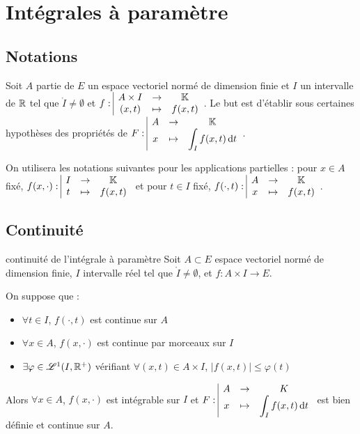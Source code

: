 \section{Intégrales à paramètre}
\subsection{Notations }

Soit $A$ partie de $E$ un espace vectoriel normé de dimension finie et $I$ un 
intervalle de $\mathbb{R}$ tel que $\mathring I \neq \emptyset$ et 
$f: \space \begin{array}{|ccc} \displaystyle A \times I & \to & \displaystyle \mathbb{K} \\ \displaystyle (x, t) & \mapsto & \displaystyle f(x, t) \end{array}$. Le but est d'établir sous 
certaines hypothèses des propriétés de $F: \space \begin{array}{|ccc} \displaystyle A & \to & \displaystyle \mathbb{K} \\ \displaystyle x & \mapsto & \displaystyle \int_I f(x, t) \,\mathrm{d}t \end{array}$.

On utilisera les notations suivantes pour les applications partielles : 
pour $x \in A$ fixé, $f(x, \cdot): \space \begin{array}{|ccc} \displaystyle I & \to & \displaystyle \mathbb{K} \\ \displaystyle t & \mapsto & \displaystyle f(x, t) \end{array}$ et pour $t \in I$ fixé, $f(\cdot, t): \space \begin{array}{|ccc} \displaystyle A & \to & \displaystyle \mathbb{K} \\ \displaystyle x & \mapsto & \displaystyle f(x, t) \end{array}$.

\subsection{Continuité }

\begin{theoreme}{continuité de l'intégrale à paramètre}{}
    Soit $A \subset E$ espace vectoriel normé de dimension finie, $I$ intervalle réel tel que 
    $\mathring I \neq \emptyset$, et $f : A \times I \to E$. 

    On suppose que : 
    \begin{itemize}
        \item $\forall t \in I$, $f(\cdot, t)$ est continue sur $A$
        \item $\forall x \in A$, $f(x, \cdot)$ est continue par morceaux sur $I$ 
        \item $\exists \varphi \in \mathscr L^1(I, \mathbb{R}^+)$ vérifiant $\forall (x, t) \in A \times I$, $|f(x, t)| \leqslant \varphi(t)$
    \end{itemize}

    Alors $\forall x \in A$, $f(x, \cdot)$ est intégrable sur $I$ et $F: \space \begin{array}{|ccc} \displaystyle A & \to & \displaystyle K \\ \displaystyle x & \mapsto & \displaystyle \int_I f(x, t) \,\mathrm{d}t \end{array}$ est 
    bien définie et continue sur $A$.
\end{theoreme}


